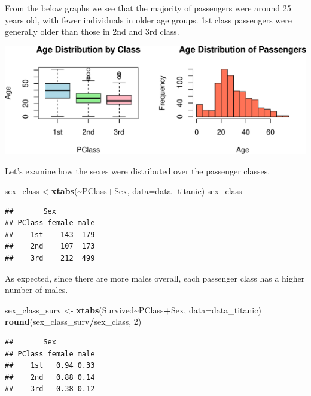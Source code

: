 \documentclass[
  11pt,
]{article}
\newenvironment{Shaded}{\begin{snugshade}}{\end{snugshade}}
\newcommand{\AttributeTok}[1]{\textcolor[rgb]{0.13,0.29,0.53}{#1}}
\newcommand{\DecValTok}[1]{\textcolor[rgb]{0.00,0.00,0.81}{#1}}
\newcommand{\FunctionTok}[1]{\textcolor[rgb]{0.13,0.29,0.53}{\textbf{#1}}}
\newcommand{\NormalTok}[1]{#1}
\newcommand{\OtherTok}[1]{\textcolor[rgb]{0.56,0.35,0.01}{#1}}
\newcommand{\SpecialCharTok}[1]{\textcolor[rgb]{0.81,0.36,0.00}{\textbf{#1}}}
\begin{document}
From the below graphs we see that the majority of passengers were around
25 years old, with fewer individuals in older age groups. 1st class
passengers were generally older than those in 2nd and 3rd class.

\includegraphics{ReportAssignment2_files/figure-latex/unnamed-chunk-3-1.pdf}

Let's examine how the sexes were distributed over the passenger classes.

\begin{Shaded}
\begin{Highlighting}[]
\NormalTok{sex\_class }\OtherTok{\textless{}{-}}\FunctionTok{xtabs}\NormalTok{(}\SpecialCharTok{\textasciitilde{}}\NormalTok{PClass}\SpecialCharTok{+}\NormalTok{Sex, }\AttributeTok{data=}\NormalTok{data\_titanic)}
\NormalTok{sex\_class}
\end{Highlighting}
\end{Shaded}

\begin{verbatim}
##       Sex
## PClass female male
##    1st    143  179
##    2nd    107  173
##    3rd    212  499
\end{verbatim}

As expected, since there are more males overall, each passenger class
has a higher number of males.

\begin{Shaded}
\begin{Highlighting}[]
\NormalTok{sex\_class\_surv }\OtherTok{\textless{}{-}} \FunctionTok{xtabs}\NormalTok{(Survived}\SpecialCharTok{\textasciitilde{}}\NormalTok{PClass}\SpecialCharTok{+}\NormalTok{Sex, }\AttributeTok{data=}\NormalTok{data\_titanic)}
\FunctionTok{round}\NormalTok{(sex\_class\_surv}\SpecialCharTok{/}\NormalTok{sex\_class, }\DecValTok{2}\NormalTok{)}
\end{Highlighting}
\end{Shaded}

\begin{verbatim}
##       Sex
## PClass female male
##    1st   0.94 0.33
##    2nd   0.88 0.14
##    3rd   0.38 0.12
\end{verbatim}
\end{document}

